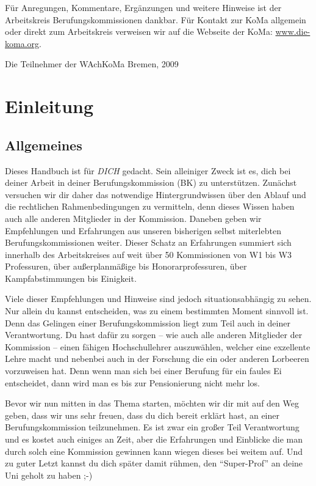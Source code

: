 \documentclass[10pt,twoside,a5paper,openright]{book}
\begin{document}
Für Anregungen, Kommentare, Ergänzungen und weitere Hinweise ist der Arbeitskreis Berufungskommissionen dankbar. Für Kontakt zur KoMa allgemein oder direkt zum Arbeitskreis verweisen wir auf die Webseite der KoMa: \url{www.die-koma.org}.

\vspace{1cm}\noindent
Die Teilnehmer der WAchKoMa Bremen, 2009




\mainmatter
\chapter{Einleitung}\thispagestyle{fancy}

\section{Allgemeines}
Dieses Handbuch ist für \emph{DICH} gedacht. Sein alleiniger Zweck ist es, dich bei deiner Arbeit in deiner Berufungskommission (BK) zu unterstützen. Zunächst versuchen wir dir daher das notwendige Hintergrundwissen über den Ablauf und die rechtlichen Rahmenbedingungen zu vermitteln, denn dieses Wissen haben auch alle anderen Mitglieder in der Kommission. Daneben geben wir Empfehlungen und Erfahrungen aus unseren bisherigen selbst miterlebten Berufungskommissionen weiter. Dieser Schatz an Erfahrungen summiert sich innerhalb des Arbeitskreises auf weit über 50 Kommissionen von W1 bis W3 Professuren, über außerplanmäßige bis Honorarprofessuren, über Kampfabstimmungen bis Einigkeit. 

Viele dieser Empfehlungen und Hinweise sind jedoch situationsabhängig zu sehen. Nur allein du kannst entscheiden, was zu einem bestimmten Moment sinnvoll ist. Denn das Gelingen einer Berufungskommission liegt zum Teil auch in deiner Verantwortung. Du hast dafür zu sorgen -- wie auch alle anderen Mitglieder der Kommission -- einen fähigen Hochschullehrer auszuwählen, welcher eine exzellente Lehre macht und nebenbei auch in der Forschung die ein oder anderen Lorbeeren vorzuweisen hat. Denn wenn man sich bei einer Berufung für ein faules Ei entscheidet, dann wird man es bis zur Pensionierung nicht mehr los.

Bevor wir nun mitten in das Thema starten, möchten wir dir mit auf den Weg geben, dass wir uns sehr freuen, dass du dich bereit erklärt hast, an einer Berufungskommission teilzunehmen. Es ist zwar ein großer Teil Verantwortung und es kostet auch einiges an Zeit, aber die Erfahrungen und Einblicke die man durch solch eine Kommission gewinnen kann wiegen dieses bei weitem auf. Und zu guter Letzt kannst du dich später damit rühmen, den "`Super-Prof"' an deine Uni geholt zu haben ;-)
\end{document}
